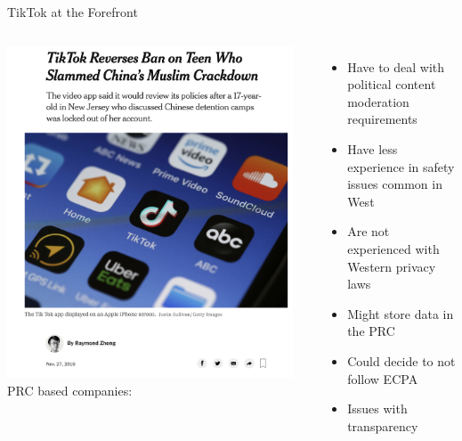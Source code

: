 \documentclass[nobackground,dvipsnames,table,aspectratio=169]{beamer}
\begin{document}
\begin{frame}{TikTok at the Forefront}
    \begin{columns}
            \includegraphics[width=0.95\textwidth]{tiktok-ban-reversal-nyt}
            PRC based companies:
            \begin{itemize}
                \item Have to deal with political content moderation requirements
                \item Have less experience in safety issues common in West
                \item Are not experienced with Western privacy laws
                \item Might store data in the PRC
                \item Could decide to not follow ECPA
                \item Issues with transparency
            \end{itemize}
    \end{columns}
\end{frame}
\end{document}
